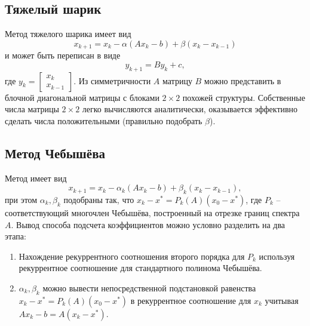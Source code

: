 \documentclass[10pt,a4paper]{article}
\begin{document}
\subsection{Тяжелый шарик}
Метод тяжелого шарика имеет вид
$$
x_{k+1} = x_k - \alpha(Ax_k-b)+\beta(x_k-x_{k-1})
$$
и может быть переписан в виде
$$
y_{k+1}=By_k+c,
$$
где $y_k=\left[\begin{array}{c}x_k\\ x_{k-1}\end{array}\right]$. Из симметричности $A$ матрицу $B$ можно представить в блочной диагональной матрицы с блоками $2\times 2$ похожей структуры. Собственные числа матрицы $2\times 2$ легко вычисляются аналитически, оказывается эффективно сделать числа положительными (правильно подобрать $\beta$).

\subsection{Метод Чебышёва}
Метод имеет вид
$$
x_{k+1} = x_k - \alpha_k(Ax_k-b)+\beta_k(x_k-x_{k-1}),
$$
при этом $\alpha_k, \beta_k$ подобраны так, что $x_{k}-x^*=P_k(A)(x_0-x^*)$, где $P_k$ -- соответствующий многочлен Чебышёва, построенный на отрезке границ спектра $A$. Вывод способа подсчета коэффициентов можно условно разделить на два этапа:
\begin{enumerate}
\item Нахождение рекуррентного соотношения второго порядка для $P_k$ используя рекуррентное соотношение для стандартного полинома Чебышёва.
\item $\alpha_k, \beta_k$ можно вывести непосредственной подстановкой равенства $x_{k}-x^*=P_k(A)(x_0-x^*)$ в рекуррентное соотношение для $x_k$ учитывая $Ax_k-b=A(x_k-x^*)$.
\end{enumerate}
\end{document}
